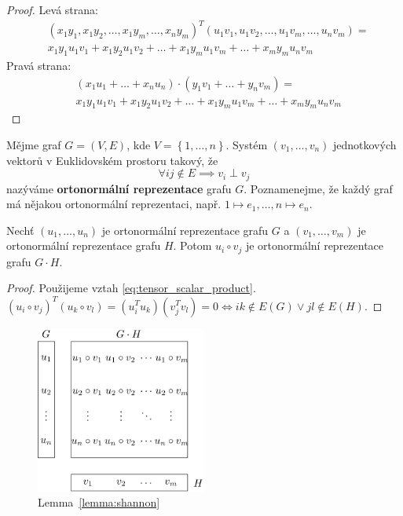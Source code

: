 \begin{proof}
    Levá strana:
    \begin{equation*}
        \begin{split}
        & \left(x_1 y_1, x_1 y_2, \dots, x_1 y_m, \dots, x_n y_m \right)^T \left( u_1 v_1, u_1 v_2, \dots, u_1 v_m, \dots, u_n v_m \right) = \\
        & x_1 y_1 u_1 v_1 + x_1 y_2 u_1 v_2 + \dots + x_1 y_m u_1 v_m + \dots + x_m y_m u_n v_m
        \end{split}
    \end{equation*}
    Pravá strana:
    \begin{equation*}
        \begin{split}
            & \left( x_1 u_1 + \dots + x_n u_n \right) \cdot \left( y_1 v_1 + \dots + y_n v_m \right) = \\
            & x_1 y_1 u_1 v_1 + x_1 y_2 u_1 v_2 + \dots + x_1 y_m u_1 v_m + \dots + x_m y_m u_n v_m
        \end{split}
    \end{equation*}
\end{proof}

Mějme graf $G = (V,E)$, kde $V = \left\{ 1, \dots, n \right\}$. Systém $\left( v_1, \dots, v_n \right)$ jednotkových vektorů v Euklidovském prostoru takový, že
$$
    \forall ij \notin E \implies v_i \perp v_j
$$
nazýváme \textbf{ortonormální reprezentace} grafu $G$. Poznamenejme, že každý graf má nějakou ortonormální reprezentaci, např. $1 \mapsto e_1, \dots, n \mapsto e_n$.

\begin{lm}
    Nechť $\left( u_1, \dots, u_n \right)$ je ortonormální reprezentace grafu $G$ a $\left( v_1, \dots, v_m \right)$ je ortonormální reprezentace grafu $H$. Potom $u_i \circ v_j$ je ortonormální reprezentace grafu $G \cdot H$.
    \label{lemma:shannon}
\end{lm}

\begin{proof}
    Použijeme vztah \ref{eq:tensor_scalar_product}. $\left( u_i \circ v_j \right)^T \left( u_k \circ v_l \right) = \left( u_i^T u_k \right) \left( v_j^T v_l \right) = 0 \iff ik \notin E(G) \vee jl \notin E(H)$.
\end{proof}

\begin{figure}[h!]
    \centering
    \includegraphics[width=0.5\textwidth]{img/shannon_lemma.png} 
    \caption{Lemma~\ref{lemma:shannon}}
\end{figure}

